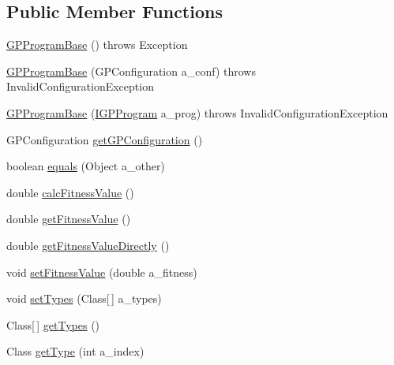 \subsection*{Public Member Functions}
\begin{DoxyCompactItemize}
\item 
\hyperlink{classorg_1_1jgap_1_1gp_1_1_g_p_program_base_ac180b60f8525986b0d20db7b22885968}{G\-P\-Program\-Base} ()  throws Exception 
\item 
\hyperlink{classorg_1_1jgap_1_1gp_1_1_g_p_program_base_a7bb94b007fec22350e9dee7a4ff86961}{G\-P\-Program\-Base} (G\-P\-Configuration a\-\_\-conf)  throws Invalid\-Configuration\-Exception 
\item 
\hyperlink{classorg_1_1jgap_1_1gp_1_1_g_p_program_base_a93a8580b9e337088bef61a43b9e8f446}{G\-P\-Program\-Base} (\hyperlink{interfaceorg_1_1jgap_1_1gp_1_1_i_g_p_program}{I\-G\-P\-Program} a\-\_\-prog)  throws Invalid\-Configuration\-Exception 
\item 
G\-P\-Configuration \hyperlink{classorg_1_1jgap_1_1gp_1_1_g_p_program_base_a55b0712c41743e7a00c4b30899917f3a}{get\-G\-P\-Configuration} ()
\item 
boolean \hyperlink{classorg_1_1jgap_1_1gp_1_1_g_p_program_base_ab91a9cdc3f5fa1d5f39b6768e27101c0}{equals} (Object a\-\_\-other)
\item 
double \hyperlink{classorg_1_1jgap_1_1gp_1_1_g_p_program_base_ac70dbb17744197e32c9f0ff9380ea973}{calc\-Fitness\-Value} ()
\item 
double \hyperlink{classorg_1_1jgap_1_1gp_1_1_g_p_program_base_a39d74595d2584fd04e9a96d039d78eda}{get\-Fitness\-Value} ()
\item 
double \hyperlink{classorg_1_1jgap_1_1gp_1_1_g_p_program_base_a9ca6210b9293b27e7feee06b3e187406}{get\-Fitness\-Value\-Directly} ()
\item 
void \hyperlink{classorg_1_1jgap_1_1gp_1_1_g_p_program_base_a910af2c40ec932de50f534c7fe5f95f0}{set\-Fitness\-Value} (double a\-\_\-fitness)
\item 
void \hyperlink{classorg_1_1jgap_1_1gp_1_1_g_p_program_base_ae9ae1f980e5fb77a4e2f6f71207e5155}{set\-Types} (Class\mbox{[}$\,$\mbox{]} a\-\_\-types)
\item 
Class\mbox{[}$\,$\mbox{]} \hyperlink{classorg_1_1jgap_1_1gp_1_1_g_p_program_base_adc1707b600d621e99ce483b470e61755}{get\-Types} ()
\item 
Class \hyperlink{classorg_1_1jgap_1_1gp_1_1_g_p_program_base_a7da304c91bd762f68d41e7965e4ef9be}{get\-Type} (int a\-\_\-index)
\item 

\end{DoxyCompactItemize}
